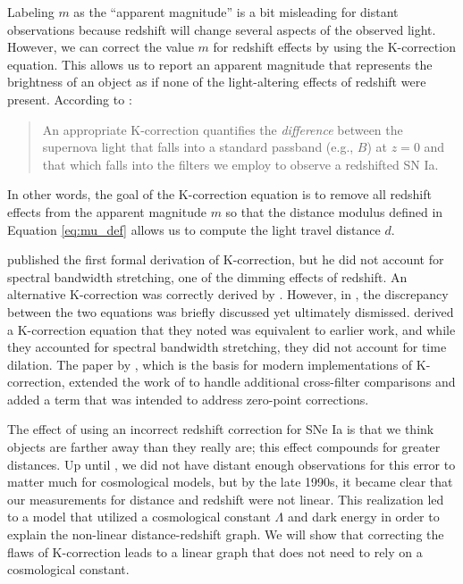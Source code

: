 \documentclass[aps,prl,reprint,amsmath,floatfix]{revtex4-2}
\begin{document}
Labeling $m$ as the ``apparent magnitude'' is a bit misleading for distant
observations because redshift will change several aspects of the observed
light. However, we can correct the value $m$ for redshift effects by using the
K-correction equation. This allows us to report an apparent magnitude that
represents the brightness of an object as if none of the light-altering effects
of redshift were present. According to \citet{riess1998}:

\begin{quote}
  An appropriate K-correction quantifies the \emph{difference} between the supernova
  light that falls into a standard passband (e.g., $B$) at ${z = 0}$ and that
  which falls into the filters we employ to observe a redshifted SN Ia.
\end{quote}

\noindent In other words, the goal of the K-correction equation is to remove
all redshift effects from the apparent magnitude $m$ so that the distance
modulus defined in Equation \ref{eq:mu_def} allows us to compute the light
travel distance $d$.

\citet{tolman1930} published the first formal derivation of K-correction, but
he did not account for spectral bandwidth stretching, one of the dimming
effects of redshift. An alternative K-correction was correctly derived by
\citet{desitter1934}. However, in \citet{hubble1935}, the discrepancy between
the two equations was briefly discussed yet ultimately dismissed.
\citet{oke1968} derived a K-correction equation that they noted was equivalent
to earlier work, and while they accounted for spectral bandwidth stretching,
they did not account for time dilation. The paper by \citet{kim1996}, which is
the basis for modern implementations of K-correction, extended the work of
\citet{oke1968} to handle additional cross-filter comparisons and added a term
that was intended to address zero-point corrections.

The effect of using an incorrect redshift correction for SNe Ia is that we think
objects are farther away than they really are; this effect compounds for
greater distances. Up until \citet{riess1998}, we did not have distant enough
observations for this error to matter much for cosmological models, but by the
late 1990s, it became clear that our measurements for distance and redshift
were not linear. This realization led to a model that utilized a cosmological
constant $\Lambda$ and dark energy in order to explain the non-linear
distance-redshift graph. We will show that correcting the flaws of K-correction
leads to a linear graph that does not need to rely on a cosmological constant.
\end{document}
